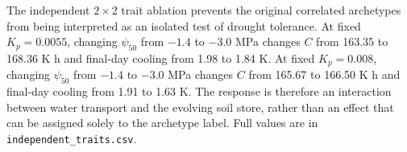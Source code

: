 The independent $2\times2$ trait ablation prevents the original correlated archetypes from being interpreted as an isolated test of drought tolerance. At fixed $K_p=0.0055$, changing $\psi_{50}$ from $-1.4$ to $-3.0$ MPa changes $C$ from 163.35 to 168.36 K h and final-day cooling from 1.98 to 1.84 K. At fixed $K_p=0.008$, changing $\psi_{50}$ from $-1.4$ to $-3.0$ MPa changes $C$ from 165.67 to 166.50 K h and final-day cooling from 1.91 to 1.63 K. The response is therefore an interaction between water transport and the evolving soil store, rather than an effect that can be assigned solely to the archetype label. Full values are in \texttt{independent\_traits.csv}.
